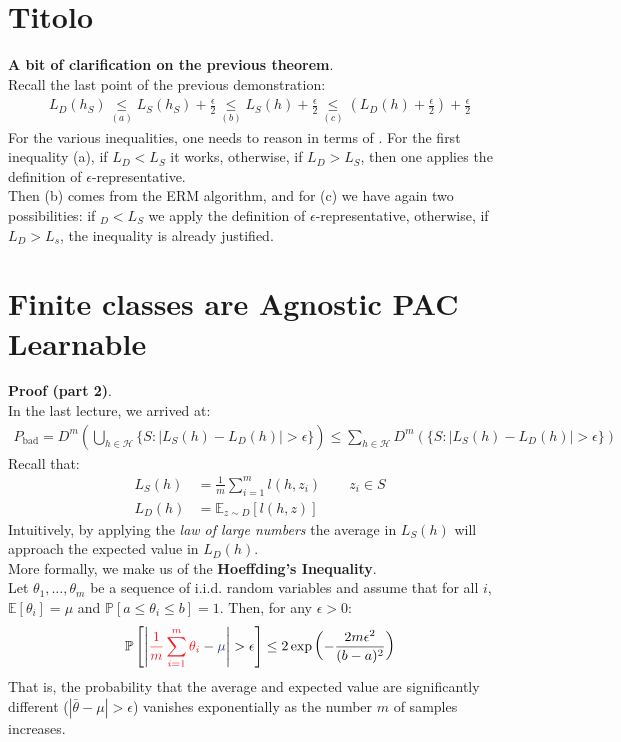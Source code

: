 \documentclass[../template.tex]{subfiles}
\begin{document}
\section{Titolo}
\textbf{A bit of clarification on the previous theorem}.\\ 
Recall the last point of the previous demonstration:
\begin{align*}
    L_D(h_S) \underset{(a)}{\leq}  L_S(h_S) + \frac{\epsilon}{2} \underset{(b)}{\leq } L_S(h) + \frac{\epsilon}{2} \underset{(c)}{\leq}  \left(L_D(h) + \frac{\epsilon}{2} \right) + \frac{\epsilon}{2}   
\end{align*}
For the various inequalities, one needs to reason in terms of . For the first inequality (a), if $L_D < L_S$ it works, otherwise, if $L_D > L_S$, then one applies the definition of $\epsilon$-representative.\\
Then (b) comes from the ERM algorithm, and for (c) we have again two possibilities: if $_D < L_S$ we apply the definition of $\epsilon$-representative, otherwise, if $L_D>L_s$, the inequality is already justified. 

\section{Finite classes are Agnostic PAC Learnable}
\textbf{Proof (part 2)}.\\ 
In the last lecture, we arrived at:
\begin{align}
    P_{\mathrm{bad}} = D^m \left(\bigcup_{h\in \mathcal{H}} \{S\colon |L_S(h) - L_D(h)| > \epsilon \}\right) \leq \sum_{h\in \mathcal{H}} D^m ( \{S \colon |L_S(h) - L_D(h)| > \epsilon\})
    \label{eqn:p-bad-start}
\end{align}
Recall that:
\begin{align*}
    L_S(h) &= \frac{1}{m} \sum_{i=1}^m l (h,z_i) \qquad z_i \in S\\
    L_D(h) &= \mathbb{E}_{z \sim D} [l(h, z)]
\end{align*}
Intuitively, by applying the \textit{law of large numbers} the average in $L_S(h)$ will approach the expected value in $L_D(h)$.\\
More formally, we make us of the \textbf{Hoeffding's Inequality}.\\
Let $\theta_1, \dots, \theta_m$ be a sequence of i.i.d. random variables and assume that for all $i$, $\mathbb{E}[\theta_i] = \mu$ and $\mathbb{P}[a \leq \theta_i \leq b] =1$. Then, for any $\epsilon > 0$:
\begin{align}
\mathbb{P} \left[\left|\textcolor{Red}{\frac{1}{m} \sum_{i=1}^{m} \theta_i} - \textcolor{Blue}{\mu}  \right| > \epsilon \right] \leq 2 \exp\left(-\frac{2m \epsilon^2}{(b-a)^2} \right)
\label{eqn:hoeffding}
\end{align}
That is, the probability that the average and expected value are significantly different ($|\bar{\theta} - \mu| > \epsilon$) vanishes exponentially as the number $m$ of samples increases.\\
\end{document}
